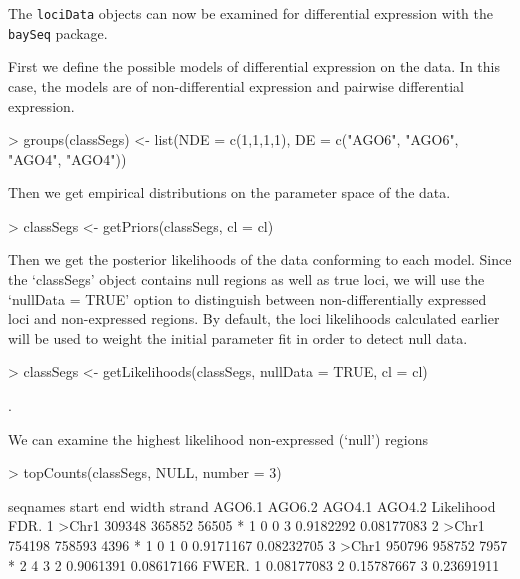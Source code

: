 \documentclass[a4paper]{article}
\begin{document}
The \verb'lociData' objects can now be examined for differential expression with the \verb'baySeq' package.

First we define the possible models of differential expression on the data. In this case, the models are of non-differential expression and pairwise differential expression.
\begin{Schunk}
\begin{Sinput}
> groups(classSegs) <- list(NDE = c(1,1,1,1), DE = c("AGO6", "AGO6", "AGO4", "AGO4"))
\end{Sinput}
\end{Schunk}

Then we get empirical distributions on the parameter space of the data.
\begin{Schunk}
\begin{Sinput}
> classSegs <- getPriors(classSegs, cl = cl)
\end{Sinput}
\end{Schunk}

Then we get the posterior likelihoods of the data conforming to each model. Since the `classSegs' object contains null regions as well as true loci, we will use the `nullData = TRUE' option to distinguish between non-differentially expressed loci and non-expressed regions. By default, the loci likelihoods calculated earlier will be used to weight the initial parameter fit in order to detect null data.
\begin{Schunk}
\begin{Sinput}
> classSegs <- getLikelihoods(classSegs, nullData = TRUE, cl = cl)
\end{Sinput}
\begin{Soutput}
.
\end{Soutput}
\end{Schunk}

We can examine the highest likelihood non-expressed (`null') regions

\begin{Schunk}
\begin{Sinput}
> topCounts(classSegs, NULL, number = 3)
\end{Sinput}
\begin{Soutput}
  seqnames  start    end width strand AGO6.1 AGO6.2 AGO4.1 AGO4.2 Likelihood       FDR.
1    >Chr1 309348 365852 56505      *      1      0      0      3  0.9182292 0.08177083
2    >Chr1 754198 758593  4396      *      1      0      1      0  0.9171167 0.08232705
3    >Chr1 950796 958752  7957      *      2      4      3      2  0.9061391 0.08617166
       FWER.
1 0.08177083
2 0.15787667
3 0.23691911
\end{Soutput}
\end{Schunk}
\end{document}
